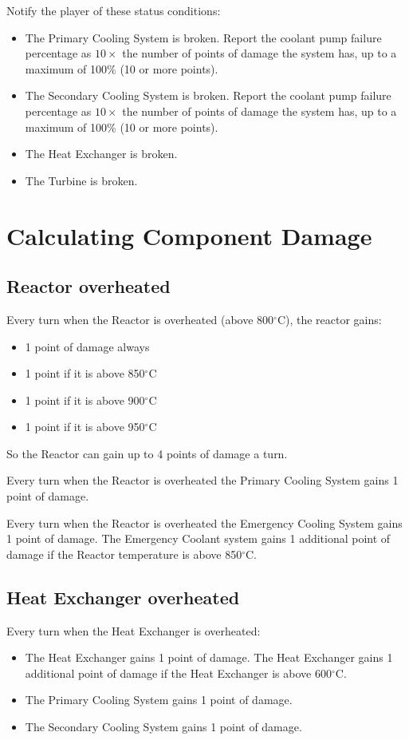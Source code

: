 \documentclass{article}
\begin{document}
Notify the player of these status conditions:

\begin{itemize}
\item The Primary Cooling System is broken.  Report the coolant pump failure percentage as $10\times$ the number of points of damage the system has, up to a maximum of 100\% (10 or more points).
\item The Secondary Cooling System is broken.  Report the coolant pump failure percentage as $10\times$ the number of points of damage the system has, up to a maximum of 100\% (10 or more points).
\item The Heat Exchanger is broken.
\item The Turbine is broken.
\end{itemize}

\section{Calculating Component Damage}
\subsection{Reactor overheated}

Every turn when the Reactor is overheated (above 800$^{\circ}$C), the reactor gains:
\begin{itemize}
\item 1 point of damage always
\item 1 point if it is above 850$^{\circ}$C
\item 1 point if it is above 900$^{\circ}$C
\item 1 point if it is above 950$^{\circ}$C
\end{itemize}

So the Reactor can gain up to 4 points of damage a turn.

Every turn when the Reactor is overheated the Primary Cooling System gains 1 point of damage.

Every turn when the Reactor is overheated the Emergency Cooling System gains 1 point of damage.  The Emergency Coolant system gains 1 additional point of damage if the Reactor temperature is above 850$^{\circ}$C.

\subsection{Heat Exchanger overheated}

Every turn when the Heat Exchanger is overheated:
\begin{itemize}
\item The Heat Exchanger gains 1 point of damage.  The Heat Exchanger gains 1 additional point of damage if the Heat Exchanger is above 600$^{\circ}$C.
\item The Primary Cooling System gains 1 point of damage.
\item The Secondary Cooling System gains 1 point of damage.
\end{itemize}
\end{document}
